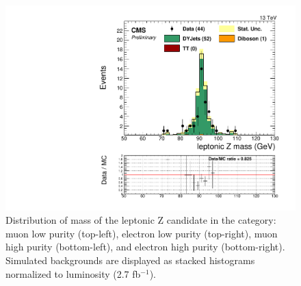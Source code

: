 \begin{figure}[h]
\begin{center}
\includegraphics[scale=0.37]{figures/control/massZllEHP.pdf}
\caption[Distribution of mass of the leptonic Z candidate]{Distribution of mass of the leptonic Z candidate in the category: muon low purity (top-left), electron low purity (top-right), muon high purity (bottom-left), and  electron high purity (bottom-right). Simulated backgrounds are displayed as stacked histograms normalized to luminosity (2.7 fb$^{-1}$).}
\label{massZll_VZ}
\end{center}
\end{figure}
